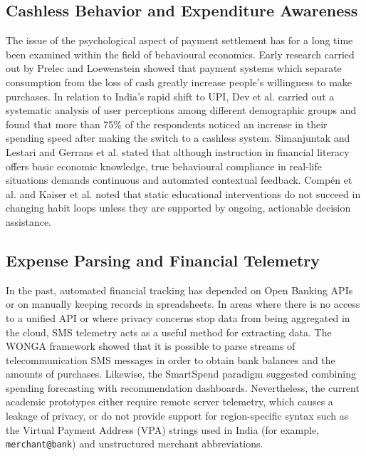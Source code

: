 \documentclass[conference]{IEEEtran}
\begin{document}
\subsection{Cashless Behavior and Expenditure Awareness}
The issue of the psychological aspect of payment settlement has for a long time been examined within the field of behavioural economics. Early research carried out by Prelec and Loewenstein showed that payment systems which separate consumption from the loss of cash greatly increase people's willingness to make purchases. In relation to India's rapid shift to UPI, Dev et al. \cite{dev2024} carried out a systematic analysis of user perceptions among different demographic groups and found that more than 75\% of the respondents noticed an increase in their spending speed after making the switch to a cashless system. Simanjuntak and Lestari \cite{simanjuntak2025} and Gerrans et al. \cite{gerrans2021} stated that although instruction in financial literacy offers basic economic knowledge, true behavioural compliance in real-life situations demands continuous and automated contextual feedback. Comp{\'e}n et al. \cite{compen2022} and Kaiser et al. \cite{kaiser2022} noted that static educational interventions do not succeed in changing habit loops unless they are supported by ongoing, actionable decision assistance.

\subsection{Expense Parsing and Financial Telemetry}
In the past, automated financial tracking has depended on Open Banking APIs or on manually keeping records in spreadsheets. In areas where there is no access to a unified API or where privacy concerns stop data from being aggregated in the cloud, SMS telemetry acts as a useful method for extracting data. The WONGA framework \cite{wonga2023} showed that it is possible to parse streams of telecommunication SMS messages in order to obtain bank balances and the amounts of purchases. Likewise, the SmartSpend paradigm \cite{smartspend2025} suggested combining spending forecasting with recommendation dashboards. Nevertheless, the current academic prototypes either require remote server telemetry, which causes a leakage of privacy, or do not provide support for region-specific syntax such as the Virtual Payment Address (VPA) strings used in India (for example, \texttt{merchant@bank}) and unstructured merchant abbreviations.
\end{document}
